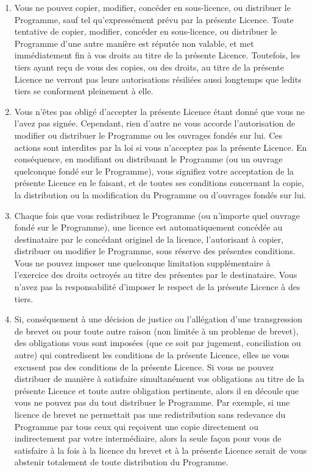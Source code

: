 {\begin{enumerate}
\item  Vous ne pouvez copier, modifier, concéder en sous-licence, ou distribuer le Programme, sauf tel qu'expressément prévu par la présente Licence. Toute tentative de copier, modifier, concéder en sous-licence, ou distribuer le Programme d'une autre manière est réputée non valable, et met immédiatement fin à vos droits au titre de la présente Licence. Toutefois, les tiers ayant reçu de vous des copies, ou des droits, au titre de la présente Licence ne verront pas leurs autorisations résiliées aussi longtemps que ledits tiers se conforment pleinement à elle.

\item  Vous n'êtes pas obligé d'accepter la présente Licence étant donné que vous ne l'avez pas signée. Cependant, rien d'autre ne vous accorde l'autorisation de modifier ou distribuer le Programme ou les ouvrages fondés sur lui. Ces actions sont interdites par la loi si vous n'acceptez pas la présente Licence. En conséquence, en modifiant ou distribuant le Programme (ou un ouvrage quelconque fondé sur le Programme), vous signifiez votre acceptation de la présente Licence en le faisant, et de toutes ses conditions concernant la copie, la distribution ou la modification du Programme ou d'ouvrages fondés sur lui.

\item  Chaque fois que vous redistribuez le Programme (ou n'importe quel ouvrage fondé sur le Programme), une licence est automatiquement concédée au destinataire par le concédant originel de la licence, l'autorisant à copier, distribuer ou modifier le Programme, sous réserve des présentes conditions. Vous ne pouvez imposer une quelconque limitation supplémentaire à l'exercice des droits octroyés au titre des présentes par le destinataire. Vous n'avez pas la responsabilité d'imposer le respect de la présente Licence à des tiers.

\item  Si, conséquement à une décision de justice ou l'allégation d'une transgression de brevet ou pour toute autre raison (non limitée à un probleme de brevet), des obligations vous sont imposées (que ce soit par jugement, conciliation ou autre) qui contredisent les conditions de la présente Licence, elles ne vous excusent pas des conditions de la présente Licence. Si vous ne pouvez distribuer de manière à satisfaire simultanément vos obligations au titre de la présente Licence et toute autre obligation pertinente, alors il en découle que vous ne pouvez pas du tout distribuer le Programme. Par exemple, si une licence de brevet ne permettait pas une redistribution sans redevance du Programme par tous ceux qui reçoivent une copie directement ou indirectement par votre intermédiaire, alors la seule façon pour vous de satisfaire à la fois à la licence du brevet et à la présente Licence serait de vous abstenir totalement de toute distribution du Programme.


\end{enumerate}}
